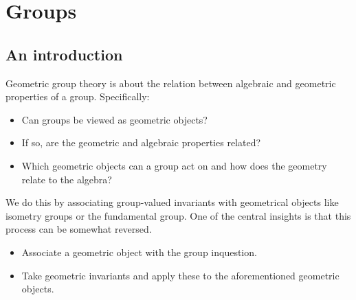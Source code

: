 \section{Groups} 
\subsection{An introduction}
Geometric group theory is about the relation between algebraic and geometric properties of a group. Specifically:
\begin{itemize}
\setlength\itemsep{-.2em}
    \item Can groups be viewed as geometric objects?
    \item If so, are the geometric and algebraic properties related?
    \item Which geometric objects can a group act on and how does the geometry relate to the algebra?
\end{itemize}
We do this by associating group-valued invariants with geometrical objects like isometry groups or the fundamental group. One of the central insights is that this process can be somewhat reversed.
\begin{itemize}
\setlength\itemsep{-.2em}
    \item Associate a geometric object with the group inquestion.
    \item Take geometric invariants and apply these to the aforementioned geometric objects.
\end{itemize}

